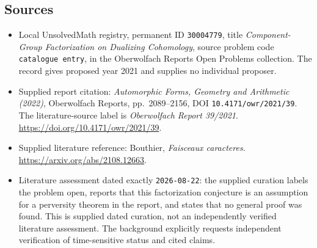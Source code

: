 \documentclass[11pt]{article}
\begin{document}
\subsection{Sources}
\begin{itemize}
\item Local UnsolvedMath registry, permanent ID \texttt{30004779}, title \emph{Component-Group Factorization on Dualizing Cohomology}, source problem code \texttt{catalogue entry}, in the Oberwolfach Reports Open Problems collection. The record gives proposed year 2021 and supplies no individual proposer.
\item Supplied report citation: \emph{Automorphic Forms, Geometry and Arithmetic (2022)}, Oberwolfach Reports, pp.\ 2089--2156, DOI \texttt{10.4171/owr/2021/39}. The literature-source label is \emph{Oberwolfach Report 39/2021}. \url{https://doi.org/10.4171/owr/2021/39}.
\item Supplied literature reference: Bouthier, \emph{Faisceaux caracteres}. \url{https://arxiv.org/abs/2108.12663}.
\item Literature assessment dated exactly \texttt{2026-08-22}: the supplied curation labels the problem open, reports that this factorization conjecture is an assumption for a perversity theorem in the report, and states that no general proof was found. This is supplied dated curation, not an independently verified literature assessment. The background explicitly requests independent verification of time-sensitive status and cited claims.
\end{itemize}
\end{document}
